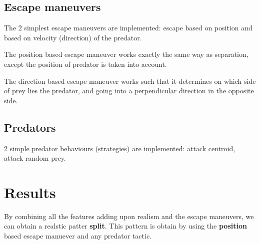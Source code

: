 \documentclass[9pt]{pnas-new}
\begin{document}
\subsection*{Escape maneuvers}

The 2 simplest escape maneuvers are implemented: escape based on position and based on velocity (direction) of the predator.

The position based escape maneuver works exactly the same way as separation, except the position of predator is taken into account.

The direction based escape maneuver works such that it determines on which side of prey lies the predator, and going into a perpendicular direction in the opposite side.

\subsection*{Predators}

2 simple predator behaviours (strategies) are implemented: attack centroid, attack random prey.

\section*{Results}

By combining all the features adding upon realism and the escape maneuvers, we can obtain a realstic patter \textbf{split}.
This pattern is obtain by using the \textbf{position} based escape manuever and any predator tactic.
\end{document}
